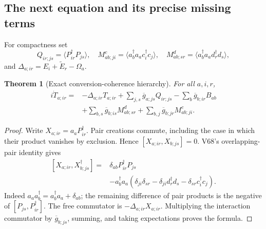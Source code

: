 \documentclass[11pt]{article}
\newtheorem{theorem}{Theorem}[section]
\theoremstyle{remark}
\begin{document}
\subsection{The next equation and its precise missing terms}

For compactness set
\[
 Q_{ir;js}=\langle P_{ir}^\dagger P_{js}\rangle,\quad
 M^c_{ab;ji}=\langle a_b^\dagger a_a c_i^\dagger c_j\rangle,\quad
 M^d_{ab;sr}=\langle a_b^\dagger a_a d_r^\dagger d_s\rangle,
\]
and \(\Delta_{a;ir}=E_i+\widetilde E_r-\Omega_a\).

\begin{theorem}[Exact conversion-coherence hierarchy]
\label{thm:v20v69-conversion}
For all \(a,i,r\),
\[
 \begin{split}
 i\dot T_{a;ir}={}&-\Delta_{a;ir}T_{a;ir}
       +\sum_{j,s}\overline g_{a;js}Q_{ir;js}
       -\sum_b\overline g_{b;ir}B_{ab}\\
 &+\sum_{b,s}\overline g_{b;is}M^d_{ab;sr}
       +\sum_{b,j}\overline g_{b;jr}M^c_{ab;ji}.
 \end{split}
\]
\end{theorem}
\begin{proof}
Write \(X_{a;ir}=a_aP_{ir}^\dagger\).
Pair creations commute, including the case in which
their product vanishes by exclusion.  Hence
\([X_{a;ir},X_{b;js}]=0\).
V68's overlapping-pair identity gives
\[
 \begin{split}
 [X_{a;ir},X_{b;js}^\dagger]
 ={}&\delta_{ab}P_{ir}^\dagger P_{js}\\
 &-a_b^\dagger a_a
     (\delta_{ji}\delta_{sr}
            -\delta_{ji}d_r^\dagger d_s
            -\delta_{sr}c_i^\dagger c_j).
 \end{split}
\]
Indeed \(a_a a_b^\dagger=a_b^\dagger a_a+\delta_{ab}\);
the remaining difference of pair products is the
negative of \([P_{js},P_{ir}^\dagger]\).
The free commutator is \(-\Delta_{a;ir}X_{a;ir}\).
Multiplying the interaction commutator by
\(\overline g_{b;js}\), summing, and taking expectations
proves the formula.
\end{proof}
\end{document}
